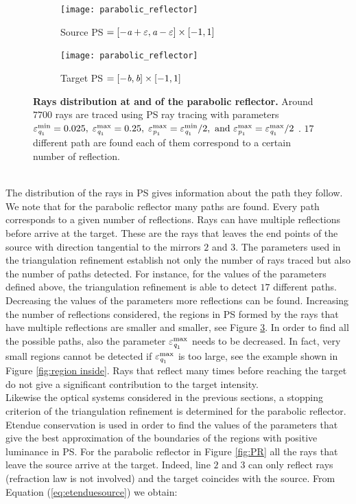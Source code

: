 \begin{figure}[h]
 \begin{subfigure}[t]{0.47\textwidth}
\centering
    \texttt{[image: parabolic\_reflector]}
    \caption{Source PS  $= [-\textit{a}+\varepsilon,\textit{a}-\varepsilon]\times[-1,1]$}
    \label{fig:source_triang_pr}
\end{subfigure}
\hfill
\begin{subfigure}[t]{0.47\textwidth}
\centering
    \texttt{[image: parabolic\_reflector]}
    \caption{Target PS  $= [-\textit{b},\textit{b}]\times[-1,1]$}
    \label{fig:target_triang_pr}
\end{subfigure}
\caption{\textbf{Rays distribution at  and  of the parabolic reflector.} Around $7700$ rays are traced using PS ray tracing with parameters $\varepsilon_{\textit{q}_1}^{\textrm{min}} = 0.025, \; \varepsilon_{\textit{q}_1}^{\textrm{max}} = 0.25, \; \varepsilon_{\textit{p}_1}^{\textrm{max}} = \varepsilon_{\textit{q}_1}^{\textrm{min}}/2, \mbox{ and }  \varepsilon_{\textit{p}_1}^{\textrm{max}} = \varepsilon_{\textit{q}_1}^{\textrm{max}}/2$ . $17$ different path are found each of them correspond to a certain number of reflection.}
 \label{fig:phase_space_pr}
\end{figure}\\ 
The distribution of the rays in PS gives information about the path they follow. We note that for the parabolic reflector many paths are found. Every path corresponds to a given number of reflections. Rays can have multiple reflections before arrive at the target. These are the rays that leaves the end points of the source with direction tangential to the mirrors $2$ and $3$. The parameters used in the triangulation refinement establish not only the number of rays traced but also the number of paths detected. For instance, for the values of the parameters defined above, the triangulation refinement is able to detect $17$ different paths. Decreasing the values of the parameters more reflections can be found. 
Increasing the number of reflections considered, the regions in PS formed by the rays that have multiple reflections are smaller and smaller, see Figure \ref{fig:phase_space_pr}. In order to find all the possible paths, also the parameter $\varepsilon_{\textit{q}_1}^{\textrm{max}}$ needs to be decreased. In fact, very small regions cannot be detected if $\varepsilon_{\textit{q}_1}^{\textrm{max}}$ is too large, see the example shown in Figure \ref{fig:region inside}.
Rays that reflect many times before reaching the target do not give a significant contribution to the target intensity.\\ \indent Likewise the optical systems considered in the previous sections, a stopping criterion of the triangulation refinement is determined for the parabolic reflector. Etendue conservation is used in order to find the values of the parameters that give the best approximation of the boundaries of the regions with positive luminance in PS. For the parabolic reflector in Figure \ref{fig:PR} all the rays that leave the source arrive at the target. Indeed, line $2$ and $3$ can only reflect rays (refraction law is not involved) and the target coincides with the source. From Equation (\ref{eq:etenduesource}) we obtain:
